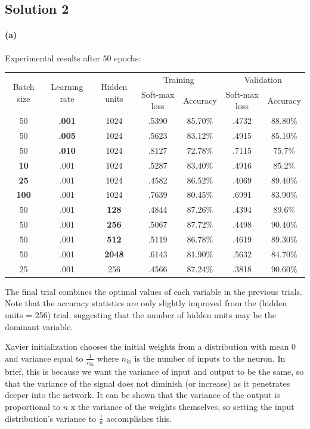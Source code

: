 \documentclass{article}
\newcommand{\solution}[1]{\clearpage \subsection*{Solution #1}}
\newcommand{\spart}[1]{\paragraph{(#1)}}
\begin{document}
\solution{2}

\spart{a} Experimental results after 50 epochs:

\begin{center}
\begin{tabular}{ c c c c c c c }
\hline
\multirow{2}{*}{Batch size} & 
\multirow{2}{*}{Learning rate} & 
\multirow{2}{*}{Hidden units} & 
\multicolumn{2}{c}{ Training } &
\multicolumn{2}{c}{ Validation } \\
	&&& Soft-max loss & Accuracy & Soft-max loss & Accuracy \\
\hline
50 & \textbf{.001} & 1024 & .5390 & 85.70\% & .4732 & 88.80\% \\
50 & \textbf{.005} & 1024 & .5623 & 83.12\% & .4915 & 85.10\% \\
50 & \textbf{.010} & 1024 & .8127 & 72.78\% & .7115 & 75.7\% \\
\textbf{10} & .001 & 1024 & .5287 & 83.40\% & .4916 & 85.2\% \\
\textbf{25} & .001 & 1024 & .4582 & 86.52\% & .4069 & 89.40\% \\
\textbf{100} & .001 & 1024 & .7639 & 80.45\% & .6991 & 83.90\% \\
50 & .001 & \textbf{128} & .4844 & 87.26\% & .4394 & 89.6\% \\
50 & .001 & \textbf{256} & .5067 & 87.72\% & .4498 & 90.40\% \\
50 & .001 & \textbf{512} & .5119 & 86.78\% & .4619 & 89.30\% \\
50 & .001 & \textbf{2048} & .6143 & 81.90\% & .5632 & 84.70\% \\
25 & .001 & 256 & .4566 & 87.24\% & .3818 & 90.60\% \\
\hline
\end{tabular}
\end{center}

The final trial combines the optimal values of each variable in the previous trials. Note that the accuracy statistics are only slightly improved from the (hidden units = 256) trial, suggesting that the number of hidden units may be the dominant variable. 

Xavier initialization chooses the initial weights from a distribution with mean 0 and variance equal to $\frac{1}{n_\text{in}}$ where $n_\text{in}$ is the number of inputs to the neuron. In brief, this is because we want the variance of input and output to be the same, so that the variance of the signal does not diminish (or increase) as it penetrates deeper into the network. It can be shown that the variance of the output is proportional to $n$ x the variance of the weights themselves, so setting the input distribution's variance to $\frac{1}{n}$ accomplishes this.
\end{document}
